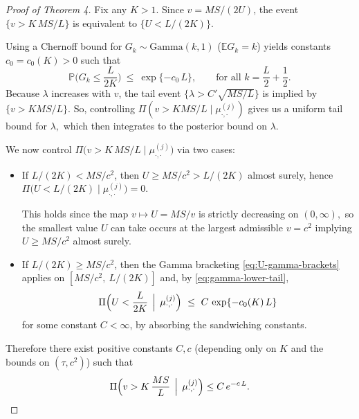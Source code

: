 \documentclass[11pt]{article}
\newcommand{\E}{\mathbb{E}} %
\theoremstyle{plain}
\theoremstyle{definition}
\theoremstyle{plain}
\begin{document}
\begin{proof}[Proof of Theorem 4]
Fix any $K>1$. Since $v = MS/(2U)$, the event $\{v> K\,MS/L\}$ is equivalent to
$\{U< L/(2K)\}$. 

Using a Chernoff bound for $G_k\sim\mathrm{Gamma}(k,1)$ ($\E G_k=k$) yields constants $c_0=c_0(K)>0$ such that
\begin{equation}
\label{eq:gamma-lower-tail}
\mathbb P\Big(G_k \le \frac{L}{2K}\Big)
\ \le\ \exp\{-c_0\,L\},
\qquad \text{for all }k=\frac{L}{2}+\frac12.
\end{equation}
Because $\lambda$ increases with $v$, the tail event $\{\lambda > C' \sqrt{MS/L}\}$ is implied by $\{v > KMS /L\}.$ So, controlling $\Pi(v > KMS /L\mid \mu_{\cdot,\cdot}^{(j)})$ gives us a uniform tail bound for $\lambda,$ which then integrates to the posterior bound on $\lambda.$

We now control $\Pi\big(v> K\,MS/L \mid \mu^{(j)}_{\cdot,\cdot}\big)$ via two cases:
\begin{itemize}
\item[(1)] If ${L}/{(2K)}<{MS}/{c^2}$, then $U\ge MS/c^2>{L}/{(2K)}$ almost surely, hence
$\Pi\big(U< L/(2K)\mid \mu^{(j)}_{\cdot,\cdot}\big)=0$. 

This holds since the map $v \mapsto U =MS/v$ is strictly decreasing on $(0,\infty),$ so the smallest value $U$ can take occurs at the largest admissible $v = c^2$ implying $ U \ge MS/c^2$ almost surely.
\item[(2)] If ${L}/{(2K)}\ge {MS}/{c^2}$, then the Gamma bracketing \eqref{eq:U-gamma-brackets} applies on $[MS/c^2,\ L/(2K)]$ and, by \eqref{eq:gamma-lower-tail},
\[
\Pi\Big(U<\frac{L}{2K}\,\Bigm|\, \mu^{(j)}_{\cdot,\cdot}\Big)
\ \le\ C\,\exp\{-c_0(K)\,L\}
\]
for some constant $C<\infty$, by absorbing the sandwiching constants.
\end{itemize}
Therefore there exist positive constants $C,c$ (depending only on $K$ and the bounds on $(\tau,c^2)$) such that
\begin{equation}
\label{eq:v-tail-uniform}
\Pi\Big(v> K\,\frac{MS}{L}\,\Bigm|\, \mu^{(j)}_{\cdot,\cdot}\Big)  \le  C\,e^{-c\,L}.
\end{equation}


\end{proof}
\end{document}
